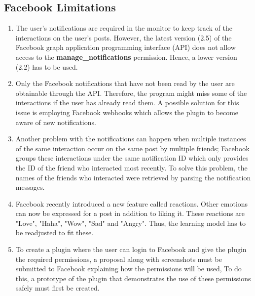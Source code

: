\documentclass[a4paper,11pt]{article}
\begin{document}
\subsection{Facebook Limitations}
\begin{enumerate}
\item The user's notifications are required in the monitor to keep track of the interactions on the user's posts. However, the latest version (2.5) of the Facebook graph application programming interface (API)\cite{GraphAPI} does not allow access to the \textbf{manage\_notifications} permission. Hence, a lower version (2.2) has to be used.

\item Only the Facebook notifications that have not been read by the user are obtainable through the API. Therefore, the program might miss some of the interactions if the user has already read them. A possible solution for this issue is employing Facebook webhooks which allows the plugin to become aware of new notifications.

\item Another problem with the notifications can happen when multiple instances of the same interaction occur on the same post by multiple friends; Facebook groups these interactions under the same notification ID which only provides the ID of the friend who interacted most recently. To solve this problem, the names of the friends who interacted were retrieved by parsing the notification messages. 

\item Facebook recently introduced a new feature called reactions\cite{FBreactions}. Other emotions can now be expressed for a post in addition to liking it. These reactions are "Love", "Haha", "Wow", "Sad" and "Angry". Thus, the learning model has to be readjusted to fit these.

\item To create a plugin where the user can login to Facebook and give the plugin the required permissions, a proposal along with screenshots must be submitted to Facebook explaining how the permissions will be used, To do this, a prototype of the plugin that demonstrates the use of these permissions safely must first be created. 
\end{enumerate}
\end{document}
